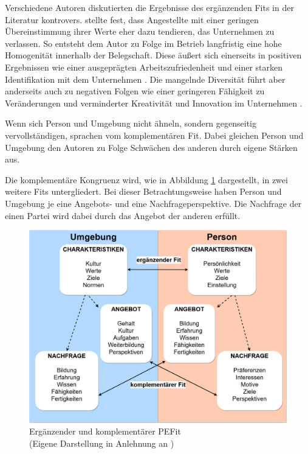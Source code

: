 Verschiedene Autoren diskutierten die Ergebnisse des ergänzenden Fits in der Literatur kontrovers. \textcite[S. 6]{schneider:1987} stellte fest, dass Angestellte mit einer geringen Übereinstimmung ihrer Werte eher dazu tendieren, das Unternehmen zu verlassen. So entsteht dem Autor zu Folge im Betrieb langfristig eine hohe Homogenität innerhalb der Belegschaft. Diese äußert sich einerseits in positiven Ergebnissen wie einer ausgeprägten Arbeitszufriedenheit und einer starken Identifikation mit dem Unternehmen \cite[S. 26]{kristof:1996}. Die mangelnde Diversität führt aber anderseits auch zu negativen Folgen wie einer geringeren Fähigkeit zu Veränderungen \cite[S. 10]{schneider:1987} und verminderter Kreativität \cite[S. 7]{chatman:1998} und Innovation im Unternehmen \cite[S. 11]{chatman:1989}. \cite[S. 4]{su:2015}

Wenn sich Person und Umgebung nicht ähneln, sondern gegenseitig vervollständigen, sprachen \textcite[S. 4]{muchinsky:1987} vom komplementären Fit. Dabei gleichen Person und Umgebung den Autoren zu Folge Schwächen des anderen durch eigene Stärken aus.

Die komplementäre Kongruenz wird, wie in Abbildung \ref{fig:personEnvironmentFit:supplementaryUndComplementary:abb1} dargestellt, in zwei weitere Fits untergliedert. Bei dieser Betrachtungsweise haben Person und Umgebung je eine Angebots- und eine Nachfrageperspektive. Die Nachfrage der einen Partei wird dabei durch das Angebot der anderen erfüllt. \cite[S. 2ff.]{caplan:1987}\cite[S. 2ff.]{edwards:1991}\cite[S. 2]{copingAndAdaption:1974}\cite[S. 3f.]{kristof:1996}

\begin{figure}[h]
	\centering
	\includegraphics[width=1\textwidth]{gfx/supplementaryComplementaryFit.jpg}
	\caption[Ergänzender und komplementärer \acs{PEFit}]{Ergänzender und komplementärer \acs{PEFit}\\
	(Eigene Darstellung in Anlehnung an \cite[S. 4]{kristof:1996})}
	\label{fig:personEnvironmentFit:supplementaryUndComplementary:abb1}
\end{figure}

